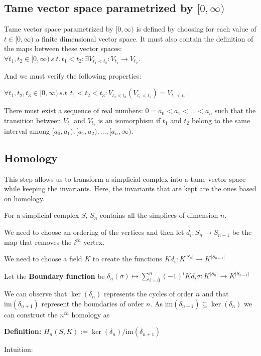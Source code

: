 \documentclass[11pt,a4paper]{article}
\begin{document}
\subsection{Tame vector space parametrized by $[0,\infty)$}
Tame vector space parametrized by $[0,\infty)$ is defined by choosing for each value of $t \in [0,\infty)$ a finite dimensional vector space. It must also contain the definition of the maps between these vector spaces: $\forall t_1, t_2 \in [0,\infty) \, s.t. \, t_1<t_2: \exists V_{t_1<t_2}: V_{t_1} \rightarrow V_{t_2}$.

And we must verify the following properties:

$\forall t_1, t_2, t_3 \in [0,\infty) \, s.t. \, t_1<t_2<t_3:  V_{t_2<t_3} (V_{t_1<t_2}) = V_{t_1<t_3}$.

There must exist a sequence of real numbers: $0=a_0<a_1<\dots<a_n$ such that the transition between $V_{t_1}$ and $V_{t_2}$ is an isomorphism if $t_1$ and $t_2$ belong to the same interval among $[a_0,a_1),[a_1,a_2),\dots,[a_n,\infty)$.




\subsection{Homology}
This step allows us to transform a simplicial complex into a tame-vector space while keeping the invariants. Here, the invariants that are kept are the ones based on homology.

For a simplicial complex $S$, $S_n$ contains all the simplices of dimension $n$.

We need to choose an ordering of the vertices and then let $d_i:S_n \rightarrow S_{n-1}$ be the map that removes the $i^{th}$ vertex.

We need to choose a field $K$ to create the functions $Kd_i: K^{|S_n|} \rightarrow K^{|S_{n-1}|}$

Let the \textbf{Boundary function} be $\delta_{n}(\sigma) \longmapsto \sum_{i=0}^{n}(-1)^i Kd_i \sigma: K^{|S_n|} \rightarrow K^{|S_{n-1}|}$

We can observe that $\ker(\delta_{n})$ represents the cycles of order $n$ and that $\text{im}(\delta_{n+1})$ represent the boundaries of order $n$. As $\text{im}(\delta_{n+1}) \subseteq \ker(\delta_{n})$ we can construct the $n^{th}$ homology as 

\textbf{Definition:}
$H_n(S, K) := \ker(\delta_n)/\text{im}(\delta_{n+1})$

Intuition:
\end{document}
